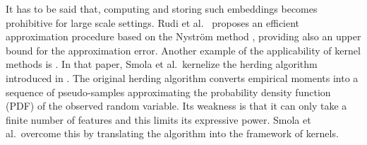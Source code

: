 It has to be said that, computing and storing such embeddings becomes prohibitive for large scale settings. Rudi et al.\ \cite{2022nystrom} proposes an efficient approximation procedure based on the Nyström method \cite{nystrom}, providing also an upper bound for the approximation error.
Another example of the applicability of kernel methods is \cite{supersamples}. In that paper, Smola et al.\ kernelize the herding algorithm introduced in \cite{welling2009herding,welling2009herding,Welling2010}. The original herding algorithm converts empirical moments into a sequence of pseudo-samples approximating the probability density function (PDF) of the observed random variable. Its weakness is that it can only take a finite number of features and this limits its expressive power.
Smola et al.\ overcome this by translating the algorithm into the framework of kernels.


